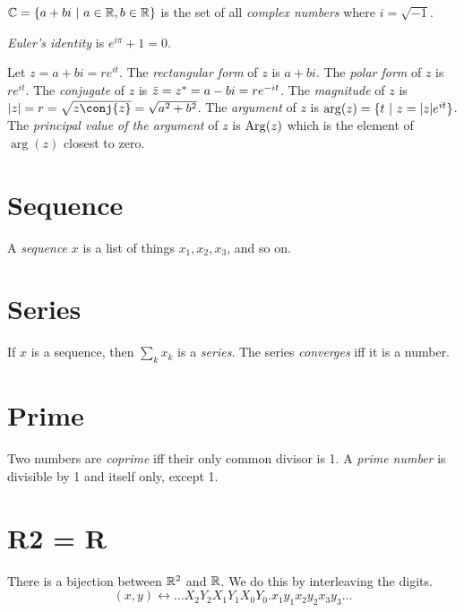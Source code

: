 \(\mathbb{C} = \{ a + bi ~|~ a \in \mathbb{R}, b \in \mathbb{R} \}\)
is the set of all \emph{complex numbers} where \(i = \sqrt{-1}\).

%
\emph{Euler's identity} is \( e^{i \pi} + 1 = 0 \).

Let \(z = a+bi = re^{it}\).
%
%
The \emph{rectangular form} of \(z\) is \(a+bi\).
%
%
The \emph{polar form} of \(z\) is \(re^{it}\).
%
%
%
The \emph{conjugate} of \(z\) is \(\bar{z} = z^* = a-bi = re^{-it}\).
%
%
%
The \emph{magnitude} of \(z\) is \(\abs{z} = r = \sqrt{z\conj{z}} = \sqrt{a^2+b^2}\).
%
%
%
The \emph{argument} of \(z\) is \(\arg(z) = \{ t ~|~ z = |z| e^{it} \}\).
%
%
%
The \emph{principal value of the argument} of \(z\) is \(\mathrm{Arg}(z)\)
which is the element of \(\arg(z)\) closest to zero.

\section{Sequence}

%
A \emph{sequence} \(x\) is a list of things \(x_1, x_2, x_3\), and so on.

\section{Series}

%
If \(x\) is a sequence, then \(\sum_k x_k\) is a \emph{series}.
The series \emph{converges} iff it is a number.

\section{Prime}

%
%
Two numbers are \emph{coprime} iff their only common divisor is 1.
%
%
A \emph{prime number} is divisible by 1 and itself only, except 1.

\section{R2 = R}

There is a bijection between \(\mathbb{R}^2\) and \(\mathbb{R}\).
We do this by interleaving the digits.
\[
    (x, y) \leftrightarrow \ldots X_2 Y_2 X_1 Y_1 X_0 Y_0 . x_1 y_1 x_2 y_2 x_3 y_3 \ldots
\]
